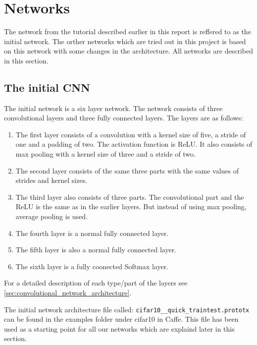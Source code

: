 \graphicspath{{Chapters/Project/}}

\section{Networks} %
\label{sec:networks}

The network from the tutorial described earlier in this report is reffered to
as the initial network. The orther networks which are tried out in this
project is based on this network with some changes in the architecture. All
networks are described in this section.

\subsection{The initial CNN} %
\label{sub:the_initial_network}

The initial network is a six layer network. The network consists of three
convolutional layers and three fully connected layers. The layers are as
follows:

\begin{enumerate}
	\item The first layer consists of a convolution with a kernel size of five, a
	stride of one and a padding of two. The activation function is ReLU. It
	also consists of max pooling with a kernel size of three and a stride of two.
	\item The second layer consists of the same three parts with the same values
	of strides and kernel sizes.
	\item The third layer also consists of three parts. The convolutional part
	and the ReLU is the same as in the earlier layers. But instead of using max
	pooling, average pooling is used.
	\item The fourth layer is a normal fully connected layer.
	\item The fifth layer is also a normal fully connected layer.
	\item The sixth layer is a fully coonected Softmax layer.
\end{enumerate}
For a detailed description of each type/part of the layers see
\autoref{sec:convolutional_network_architecture}.

The initial network architecture file called:
\verb|cifar10__quick_traintest.prototx| can be found in the examples folder
under cifar10 in Caffe\cite{caffe}. This file has been used as a starting point
for all our networks which are explaind later in this section. 

